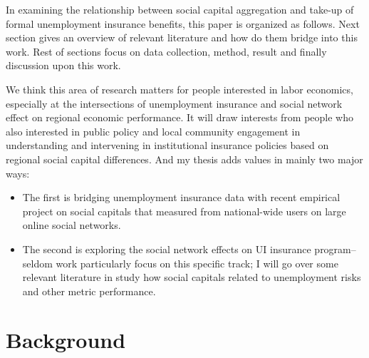 \documentclass{article}
\begin{document}
In examining the relationship between social capital aggregation and take-up of formal unemployment insurance benefits, this paper is organized as follows. Next section gives an overview of relevant literature and how do them bridge into this work. Rest of sections focus on data collection, method, result and finally discussion upon this work.


We think this area of research matters for people interested in labor economics, especially at the intersections of unemployment insurance and social network effect on regional economic performance. It will draw interests from people who also interested in public policy and local community engagement in understanding and intervening in institutional insurance policies based on regional social capital differences. And my thesis adds values in mainly two major ways: 
\begin{itemize}
\item The first is bridging unemployment insurance data with recent empirical project on social capitals that measured from national-wide users on large online social networks.

\item The second is exploring the social network effects on UI insurance program--seldom work particularly focus on this specific track; I will go over some relevant literature in study how social capitals related to unemployment risks and other metric performance.
 
\end{itemize}



\section{Background}
\end{document}
